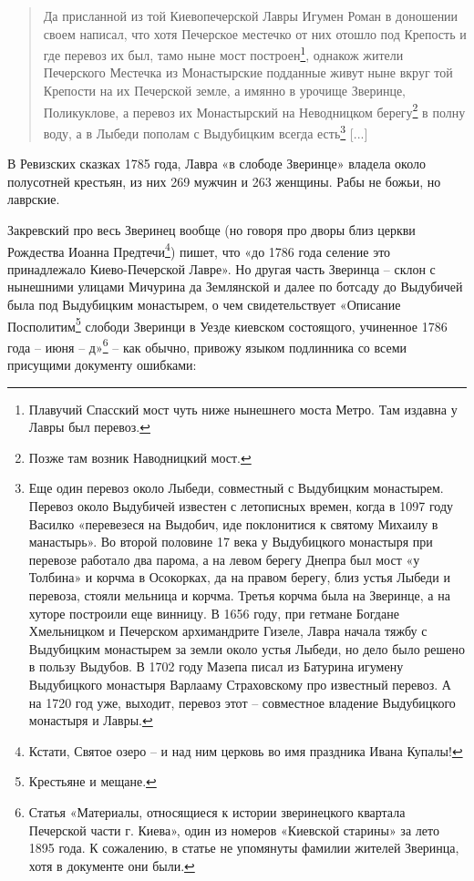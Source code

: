 \begin{quotation}
Да присланной из той Киевопечерской Лавры Игумен Роман в доношении своем написал, что хотя Печерское местечко от них отошло под Крепость и где перевоз их был, тамо ныне мост построен\footnote{Плавучий Спасский мост чуть ниже нынешнего моста Метро. Там издавна у Лавры был перевоз.}, однакож жители Печерского Местечка из Монастырские подданные живут ныне вкруг той Крепости на их Печерской земле, а имянно в урочище Зверинце, Поликуклове, а перевоз их Монастырский на Неводницком берегу\footnote{Позже там возник Наводницкий мост.} в полну воду, а в Лыбеди пополам с Выдубицким всегда есть\footnote{Еще один перевоз около Лыбеди, совместный с Выдубицким монастырем. Перевоз около Выдубичей известен с летописных времен, когда в 1097 году Василко «перевезеся на Выдобич, иде поклонитися к святому Михаилу в манастырь». Во второй половине 17 века у Выдубицкого монастыря при перевозе работало два парома, а на левом берегу Днепра был мост «у Толбина» и корчма в Осокорках, да на правом берегу, близ устья Лыбеди и перевоза, стояли мельница и корчма. Третья корчма была на Зверинце, а на хуторе построили еще винницу. В 1656 году, при гетмане Богдане Хмельницком и Печерском архимандрите Гизеле, Лавра начала тяжбу с Выдубицким монастырем за земли около устья Лыбеди, но дело было решено в пользу Выдубов. В 1702 году Мазепа писал из Батурина игумену Выдубицкого монастыря Варлааму Страховскому про известный перевоз. А на 1720 год уже, выходит, перевоз этот – совместное владение Выдубицкого монастыря и Лавры.} [...]
\end{quotation}
 
В Ревизских сказках 1785 года, Лавра «в слободе Зверинце» владела около полусотней крестьян, из них 269 мужчин и 263 женщины. Рабы не божьи, но лаврские.

Закревский про весь Зверинец вообще (но говоря про дворы близ церкви Рождества Иоанна Предтечи\footnote{Кстати, Святое озеро – и над ним церковь во имя праздника Ивана Купалы!}) пишет, что «до 1786 года селение это принадлежало Киево-Печерской Лавре». Но другая часть Зверинца – склон с нынешними улицами Мичурина да Землянской и далее по ботсаду до Выдубичей была под Выдубицким монастырем, о чем свидетельствует «Описание Посполитим\footnote{Крестьяне и мещане.} слободи Зверинци в Уезде киевском состоящого, учиненное 1786 года – июня – д»\footnote{Статья «Материалы, относящиеся к истории зверинецкого квартала Печерской части г. Киева», один из номеров «Киевской старины» за лето 1895 года. К сожалению, в статье не упомянуты фамилии жителей Зверинца, хотя в документе они были.} – как обычно, привожу языком подлинника со всеми присущими документу ошибками:

